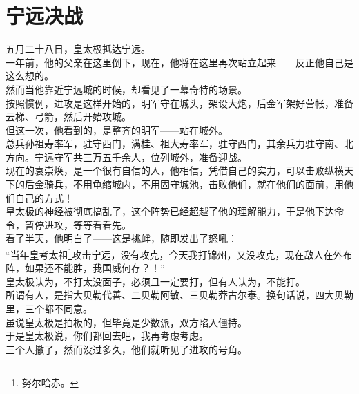 \section{宁远决战}
\ifnum{}
	\begin{multicols}{\theparacolNo}
\fi
五月二十八日，皇太极抵达宁远。\\

一年前，他的父亲在这里倒下，现在，他将在这里再次站立起来——反正他自己是这么想的。\\

然而当他靠近宁远城的时候，却看见了一幕奇特的场景。\\

按照惯例，进攻是这样开始的，明军守在城头，架设大炮，后金军架好营帐，准备云梯、弓箭，然后开始攻城。\\

但这一次，他看到的，是整齐的明军——站在城外。\\

总兵孙祖寿率军，驻守西门，满桂、祖大寿率军，驻守西门，其余兵力驻守南、北方向。宁远守军共三万五千余人，位列城外，准备迎战。\\

现在的袁崇焕，是一个很有自信的人，他相信，凭借自己的实力，可以击败纵横天下的后金骑兵，不用龟缩城内，不用固守城池，击败他们，就在他们的面前，用他们自己的方式！\\

皇太极的神经被彻底搞乱了，这个阵势已经超越了他的理解能力，于是他下达命令，暂停进攻，等等看看先。\\

看了半天，他明白了——这是挑衅，随即发出了怒吼：\\

“当年皇考太祖\footnote{努尔哈赤。}攻击宁远，没有攻克，今天我打锦州，又没攻克，现在敌人在外布阵，如果还不能胜，我国威何存？！”\\

皇太极认为，不打太没面子，必须且一定要打，但有人认为，不能打。\\

所谓有人，是指大贝勒代善、二贝勒阿敏、三贝勒莽古尔泰。换句话说，四大贝勒里，三个都不同意。\\

虽说皇太极是拍板的，但毕竟是少数派，双方陷入僵持。\\

于是皇太极说，你们都回去吧，我再考虑考虑。\\

三个人撤了，然而没过多久，他们就听见了进攻的号角。\\


\end{multicols}
